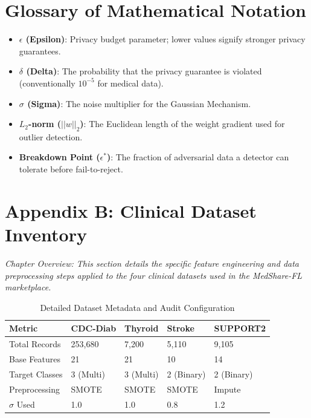 \documentclass[10pt, a4paper, twocolumn]{article}
\begin{document}
\section*{Glossary of Mathematical Notation}
\begin{itemize}
    \item \textbf{$\epsilon$ (Epsilon)}: Privacy budget parameter; lower values signify stronger privacy guarantees.
    \item \textbf{$\delta$ (Delta)}: The probability that the privacy guarantee is violated (conventionally $10^{-5}$ for medical data).
    \item \textbf{$\sigma$ (Sigma)}: The noise multiplier for the Gaussian Mechanism.
    \item \textbf{$L_2$-norm ($||w||_2$)}: The Euclidean length of the weight gradient used for outlier detection.
    \item \textbf{Breakdown Point ($\epsilon^*$)}: The fraction of adversarial data a detector can tolerate before fail-to-reject.
\end{itemize}

\section*{Appendix B: Clinical Dataset Inventory}

\textit{Chapter Overview: This section details the specific feature engineering and data preprocessing steps applied to the four clinical datasets used in the MedShare-FL marketplace.}

\begin{table}[hbt!]
\centering
\scriptsize
\begin{tabular}{lp{1.4cm}p{1.4cm}p{1.4cm}p{1.4cm}}
\toprule
\textbf{Metric} & \textbf{CDC-Diab} & \textbf{Thyroid} & \textbf{Stroke} & \textbf{SUPPORT2} \\
\midrule
Total Records & 253,680 & 7,200 & 5,110 & 9,105 \\
Base Features & 21 & 21 & 10 & 14 \\
Target Classes & 3 (Multi) & 3 (Multi) & 2 (Binary) & 2 (Binary) \\
Preprocessing & SMOTE & SMOTE & SMOTE & Impute \\
$\sigma$ Used & 1.0 & 1.0 & 0.8 & 1.2 \\
\bottomrule
\end{tabular}
\caption{Detailed Dataset Metadata and Audit Configuration}
\end{table}
\end{document}
